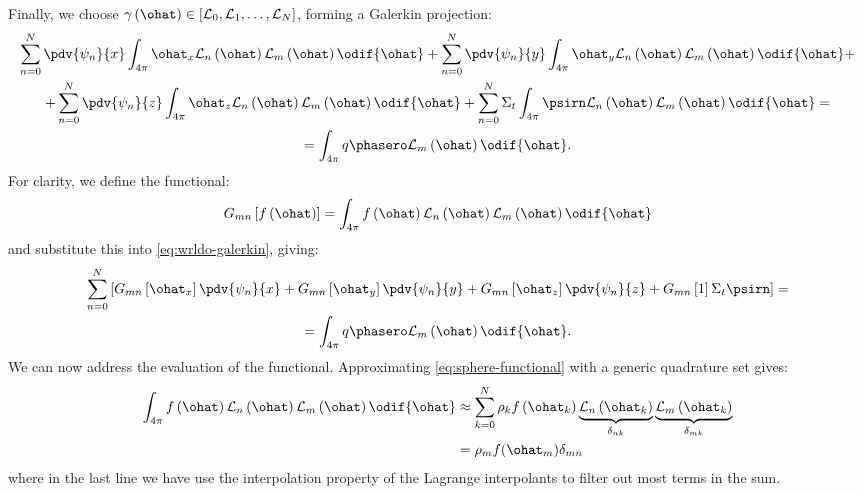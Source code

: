 Finally, we choose $\gamma\left(\ohat\right) \in [\mathcal{L}_0,\mathcal{L}_1,\ldots,\mathcal{L}_N]$, forming a Galerkin projection:
\begin{multline}
  \label{eq:wrldo-galerkin}
  \sum_{n=0}^N\pdv{\psi_n}{x} \int_{4\pi}\ohat_x \mathcal{L}_n\left(\ohat\right)\mathcal{L}_m\left(\ohat\right) \odif{\ohat} +
  \sum_{n=0}^N\pdv{\psi_n}{y} \int_{4\pi}\ohat_y\mathcal{L}_n\left(\ohat\right)\mathcal{L}_m\left(\ohat\right) \odif{\ohat} + \\
  +\sum_{n=0}^N\pdv{\psi_n}{z} \int_{4\pi}\ohat_z\mathcal{L}_n\left(\ohat\right)\mathcal{L}_m\left(\ohat\right) \odif{\ohat} +
  \sum_{n=0}^N \Sigma_t \int_{4\pi}\psirn \mathcal{L}_n\left(\ohat\right)\mathcal{L}_m\left(\ohat\right)\odif{\ohat} = \\
  =\int_{4\pi}q\phasero\mathcal{L}_m\left(\ohat\right) \odif{\ohat}.
\end{multline}
For clarity, we define the functional:
\begin{equation}
  \label{eq:sphere-functional}
  G_{mn}\left[f\left(\ohat\right)\right]=\int_{4\pi}f\left(\ohat\right)\mathcal{L}_n\left(\ohat\right)\mathcal{L}_m\left(\ohat\right) \odif{\ohat}
\end{equation}
and substitute this into \cref{eq:wrldo-galerkin}, giving:
\begin{multline}
  \sum_{n=0}^N \left[G_{mn}\left[\ohat_x\right]\pdv{\psi_n}{x}+G_{mn}\left[\ohat_y\right]\pdv{\psi_n}{y}+ G_{mn}\left[\ohat_z\right]\pdv{\psi_n}{z} + G_{mn}\left[1\right]\Sigma_t\psirn\right]=\\=\int_{4\pi}q\phasero\mathcal{L}_m\left(\ohat\right) \odif{\ohat}.
\end{multline}
We can now address the evaluation of the functional.
Approximating \cref{eq:sphere-functional} with a generic quadrature set gives:
\begin{equation}
  \begin{split}
    \int_{4\pi}f\left(\ohat\right)\mathcal{L}_n\left(\ohat\right)\mathcal{L}_m\left(\ohat\right) \odif{\ohat} & \approx \sum_{k=0}^N \rho_k f\left(\ohat_k\right) \underbrace{\mathcal{L}_n\left(\ohat_k\right)}_{\delta_{nk}} \underbrace{\mathcal{L}_m\left(\ohat_k\right)}_{\delta_{mk}} \\
                                                                                                              & =\rho_m f(\ohat_m)\delta_{mn}
  \end{split}
\end{equation}
where in the last line we have use the interpolation property of the Lagrange interpolants to filter out most terms in the sum.

